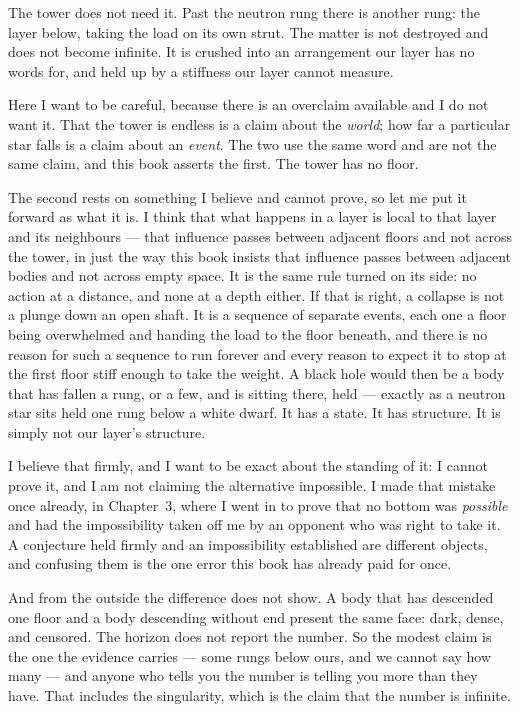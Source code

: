 The tower does not need it. Past the neutron rung there is another rung: the layer below, taking the load on its own strut. The matter is not destroyed and does not become infinite. It is crushed into an arrangement our layer has no words for, and held up by a stiffness our layer cannot measure.

Here I want to be careful, because there is an overclaim available and I do not want it. That the tower is endless is a claim about the \emph{world}; how far a particular star falls is a claim about an \emph{event}. The two use the same word and are not the same claim, and this book asserts the first. The tower has no floor.

The second rests on something I believe and cannot prove, so let me put it forward as what it is. I think that what happens in a layer is local to that layer and its neighbours --- that influence passes between adjacent floors and not across the tower, in just the way this book insists that influence passes between adjacent bodies and not across empty space. It is the same rule turned on its side: no action at a distance, and none at a depth either. If that is right, a collapse is not a plunge down an open shaft. It is a sequence of separate events, each one a floor being overwhelmed and handing the load to the floor beneath, and there is no reason for such a sequence to run forever and every reason to expect it to stop at the first floor stiff enough to take the weight. A black hole would then be a body that has fallen a rung, or a few, and is sitting there, held --- exactly as a neutron star sits held one rung below a white dwarf. It has a state. It has structure. It is simply not our layer's structure.

I believe that firmly, and I want to be exact about the standing of it: I cannot prove it, and I am not claiming the alternative impossible. I made that mistake once already, in Chapter~3, where I went in to prove that no bottom was \emph{possible} and had the impossibility taken off me by an opponent who was right to take it. A conjecture held firmly and an impossibility established are different objects, and confusing them is the one error this book has already paid for once.

And from the outside the difference does not show. A body that has descended one floor and a body descending without end present the same face: dark, dense, and censored. The horizon does not report the number. So the modest claim is the one the evidence carries --- some rungs below ours, and we cannot say how many --- and anyone who tells you the number is telling you more than they have. That includes the singularity, which is the claim that the number is infinite.

